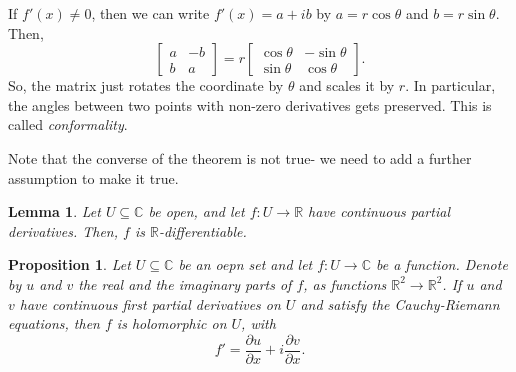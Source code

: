 \documentclass[a4paper, openany]{memoir}
\theoremstyle{definition}
\theoremstyle{plain}
\newtheorem{lemma}[definition]{Lemma}
\newtheorem{proposition}[definition]{Proposition}
\begin{document}
    If $f'(x) \neq 0$, then we can write $f'(x) = a + ib$ by $a = r \cos \theta$ and $b = r \sin \theta$. Then,
    \[\begin{bmatrix}
        a & -b \\
        b & a
    \end{bmatrix} = r \begin{bmatrix}
        \cos \theta & -\sin \theta \\
        \sin \theta & \cos \theta
    \end{bmatrix}.\]
    So, the matrix just rotates the coordinate by $\theta$ and scales it by $r$. In particular, the angles between two points with non-zero derivatives gets preserved. This is called \emph{conformality}.

    Note that the converse of the theorem is not true- we need to add a further assumption to make it true.
    \begin{lemma}
        Let $U \subseteq \mathbb{C}$ be open, and let $f \colon U \to \mathbb{R}$ have continuous partial derivatives. Then, $f$ is $\mathbb{R}$-differentiable.
    \end{lemma}
    \begin{proposition}
        Let $U \subseteq \mathbb{C}$ be an oepn set and let $f \colon U \to \mathbb{C}$ be a function. Denote by $u$ and $v$ the real and the imaginary parts of $f$, as functions $\mathbb{R}^2 \to \mathbb{R}^2$. If $u$ and $v$ have continuous first partial derivatives on $U$ and satisfy the Cauchy-Riemann equations, then $f$ is holomorphic on $U$, with
        \[f' = \frac{\partial u}{\partial x} + i \frac{\partial v}{\partial x}.\]
    \end{proposition}
\end{document}
